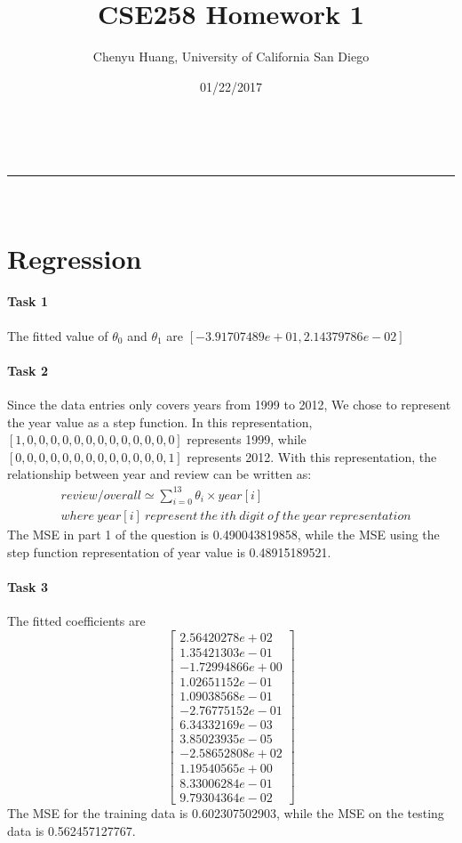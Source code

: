 \documentclass[a4paper,11pt]{article}
\makeatletter
\newcommand{\linia}{\rule{\linewidth}{0.5pt}}
\theoremstyle{mytheor}
\renewcommand{\maketitle}{
\begin{center}
\vspace{2ex}
{\huge \textsc{\@title}}
\vspace{1ex}
\\
\linia\\
\@author \hfill \@date
\vspace{4ex}
\end{center}
}
\makeatother
\begin{document}
\title{CSE258 Homework 1}

\author{Chenyu Huang, University of California San Diego}

\date{01/22/2017}

\maketitle

\section{Regression}

\paragraph{Task 1}

The fitted value of $\theta_0$ and $\theta_1$ are $[-3.91707489e+01, 2.14379786e-02]$

\paragraph{Task 2}

 Since the data entries only covers years from 1999 to 2012, We chose to represent the year value as a step function. In this representation, $[1, 0, 0, 0, 0, 0, 0, 0, 0, 0, 0, 0, 0, 0]$ represents 1999, while $[0, 0, 0, 0, 0, 0, 0, 0, 0, 0, 0, 0, 0, 1]$ represents 2012. With this representation, the relationship between year and review can be written as:
 \begin{align}
 	&review / overall \simeq \sum_{i=0}^{13} \theta_i \times year[i]\\
 	&where \ year[i] \ represent \ the \ ith \ digit \ of \ the \ year \ representation
 \end{align}
 The MSE in part 1 of the question is 0.490043819858, while the MSE using the step function representation of year value is 0.48915189521.

\paragraph{Task 3}

The fitted coefficients are
$$
\begin{bmatrix}
2.56420278e+02 \\  1.35421303e-01 \\ -1.72994866e+00  \\ 1.02651152e-01\\
1.09038568e-01 \\ -2.76775152e-01  \\ 6.34332169e-03  \\ 3.85023935e-05\\
-2.58652808e+02 \\  1.19540565e+00  \\ 8.33006284e-01 \\  9.79304364e-02
\end{bmatrix}
$$
The MSE for the training data is 0.602307502903, while the MSE on the testing data is 0.562457127767. 
\end{document}
